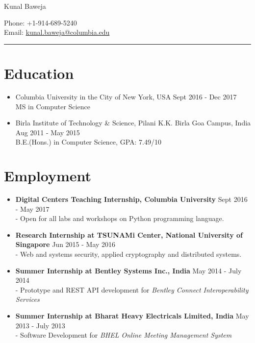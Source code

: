 \documentclass[a4]{article}
\def\name{Kunal Baweja}
\begin{document}
{\huge \name}
\hfill
\begin{minipage}{0.4\linewidth}
    Phone: +1-914-689-5240\\
    Email: \hspace{3pt}\href{mailto:kunal.baweja@columbia.edu}{kunal.baweja@columbia.edu}
\end{minipage}

\rule{\textwidth}{0.2pt}

\section*{Education}
\begin{itemize}
    
    \item Columbia University in the City of New York, USA {\hfill Sept 2016 - Dec 2017}\\
    MS in Computer Science
    
    \item Birla Institute of Technology \& Science, Pilani K.K. Birla Goa Campus, India {\hfill Aug 2011 - May 2015}\\
    B.E.(Hons.) in Computer Science, GPA: 7.49/10

\end{itemize}


\section*{Employment}
\begin{itemize}
    \item \textbf{Digital Centers Teaching Internship, Columbia University} {\hfill Sept 2016 - May 2017}\\
    - Open for all labs and workshops on Python programming language.

    \item \textbf{Research Internship at TSUNAMi Center, National University of Singapore} {\hfill Jun 2015 - May 2016}\\
    - Web and systems security, applied cryptography and distributed systems.
    
    \item \textbf{Summer Internship at Bentley Systems Inc., India} {\hfill May 2014 - July 2014}\\
    - Prototype and REST API development for \textit{Bentley Connect Interoperability Services}

    \item \textbf{Summer Internship at Bharat Heavy Electricals Limited, India} {\hfill May 2013 - July 2013}\\
    - Software Development for \textit{BHEL Online Meeting Management System}
\end{itemize}
\end{document}
